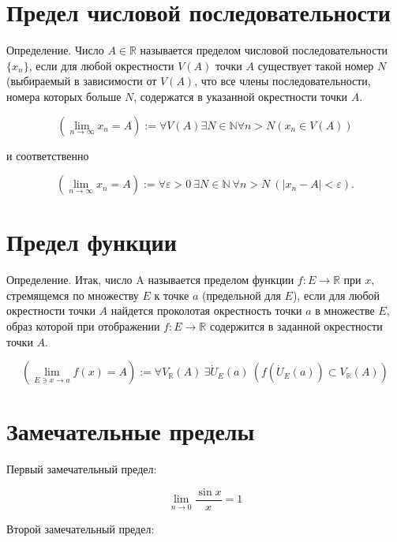 \documentclass[a4paper, 12pt]{article} %
\begin{document}
\section*{Предел числовой последовательности}
Определение. Число $A \in \mathbb{R}$ называется пределом числовой последовательности $\{x_n\}$, если для любой окрестности $V(A)$ точки $A$ существует такой номер $N$ (выбираемый в зависимости от $V(A)$, что все члены последовательности, номера которых больше $N$, содержатся в указанной окрестности точки $A$.


\begin{equation}
    (\lim_{n\to\infty} x_{n} = A) := \forall V(A) \exists N \in \mathbb{N} \forall n > N (x_n \in V(A))
\end{equation}

и соответственно

\begin{equation}
    (\lim_{n \to \infty} x_{n} = A) := \forall \varepsilon > 0 \ \exists N \in \mathbb{N} \ \forall n > N \ (|x_n - A| < \varepsilon).
\end{equation}

\clearpage

\section*{Предел функции}
Определение. Итак, число A называется пределом функции $f: E \to \mathbb{R}$ при $x$, стремящемся по множеству $E$ к точке $a$ (предельной для $E$), если для любой окрестности точки $A$ найдется проколотая окрестность точки $a$ в множестве $E$, образ которой при отображении $f : E \to \mathbb{R}$ содержится в заданной окрестности точки $A$.

\begin{equation}
    (\lim_{E \ni x \to a} f(x) = A) := \forall V_\mathbb{R}(A) \ \exists \dot{U}_E(a) \ (f(\dot{U}_E(a)) \subset V_\mathbb{R}(A))
\end{equation}

\clearpage
\section*{Замечательные пределы}

Первый замечательный предел:

\begin{equation}
    \lim_{n \to 0} \frac{\sin x}{x} = 1
\end{equation}

Второй замечательный предел:
\end{document}
